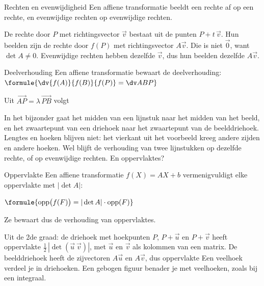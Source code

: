 \begin{theorie}
\begin{stelling}{Rechten en evenwijdigheid}
Een affiene transformatie beeldt een rechte af op een rechte, en evenwijdige rechten op evenwijdige rechten.
\end{stelling}

\begin{bewijs}
De rechte door $P$ met richtingsvector $\vec v$ bestaat uit de punten $P + t\,\vec v$. Hun beelden zijn
de rechte door $f(P)$ met richtingsvector $A\vec v$. Die is niet $\vec 0$, want $\det A \neq 0$. Evenwijdige rechten hebben dezelfde $\vec v$, dus hun beelden dezelfde $A\vec v$.
\end{bewijs}
\end{theorie}

\begin{theorie}
\begin{stelling}{Deelverhouding}
Een affiene transformatie bewaart de deelverhouding: \qquad $\formule{\dv{f(A)}{f(B)}{f(P)} = \dv ABP}$
\end{stelling}

\begin{bewijs}
Uit $\vec{AP} = \lambda\,\vec{PB}$ volgt
\end{bewijs}
\end{theorie}

In het bijzonder gaat het midden van een lijnstuk naar het midden van het beeld, en het zwaartepunt van een driehoek naar het zwaartepunt van de beelddriehoek. Lengtes en hoeken blijven niet: het vierkant uit het voorbeeld kreeg andere zijden en andere hoeken. Wel blijft de verhouding van twee lijnstukken op dezelfde rechte, of op evenwijdige rechten. En oppervlaktes?

\begin{theorie}
\begin{stelling}{Oppervlakte}
Een affiene transformatie $f(X) = AX + b$ vermenigvuldigt elke oppervlakte met $|\det A|$:

\vspace{1mm}
\qquad $\formule{\text{opp}\bigl(f(F)\bigr) = |\det A| \cdot \text{opp}(F)}$

\vspace{1mm}
Ze bewaart dus de verhouding van oppervlaktes.
\end{stelling}

\begin{bewijs}
Uit de 2de graad: de driehoek met hoekpunten $P$, $P + \vec u$ en $P + \vec v$ heeft oppervlakte $\tfrac12\,|\det(\vec u\ \vec v)|$, met $\vec u$ en $\vec v$ als kolommen van een matrix. De beelddriehoek heeft de zijvectoren $A\vec u$ en $A\vec v$, dus oppervlakte
Een veelhoek verdeel je in driehoeken. Een gebogen figuur benader je met veelhoeken, zoals bij een integraal.
\end{bewijs}
\end{theorie}

